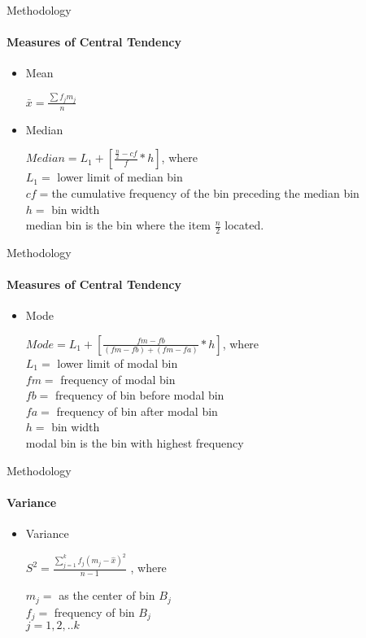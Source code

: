 \documentclass{beamer}
\begin{document}
\begin{frame}{Methodology}
\framesubtitle{Measures of Central Tendency}
\begin{itemize}
\item Mean

{\center $\bar x = \frac{\sum f_j m_j}{n}$\\}

\item Median

{\center $Median = L_1 + \left[\frac{\frac{n}{2}- cf}{f}  * h \right]$, where \\}
	\vspace{5mm}
$L_1 = $ lower limit of median bin \\
$cf = $the cumulative frequency of the bin preceding the median bin\\
$h = $ bin width \\
median bin is the bin where the item $\frac{n}{2}$ located.\\

\end{itemize}

\end{frame}

\begin{frame}{Methodology}
\framesubtitle{Measures of Central Tendency}
\begin{itemize}
	
	\item Mode
	
	{\center $Mode = L_1 + \left[\frac{fm - fb}{(fm-fb)+(fm-fa)} * h \right]$, where \\}
	\vspace{5mm}
	$L_1 = $ lower limit of modal bin \\
	$fm = $ frequency of modal bin \\
	$fb = $ frequency of bin before modal bin \\
	$fa = $ frequency of bin after modal bin \\
	$h = $ bin width \\
	modal bin is the bin with highest frequency \\
	
\end{itemize}

\end{frame}

\begin{frame}{Methodology}
\framesubtitle{Variance}
\begin{itemize}
	
	\item Variance
	
	{\center $ S^2 = \frac{\sum\limits_{j=1}^{k} f_j \left (m_j - \hat{x}\right )^2}{n-1}$ , where \\}
	
	\vspace{8mm}
	$m_j = $ as the center of bin $B_j$ \\
	$f_j = $ frequency of bin $B_j$ \\
	$ j = 1,2,..k$\\
	
\end{itemize}

\end{frame}
\end{document}
